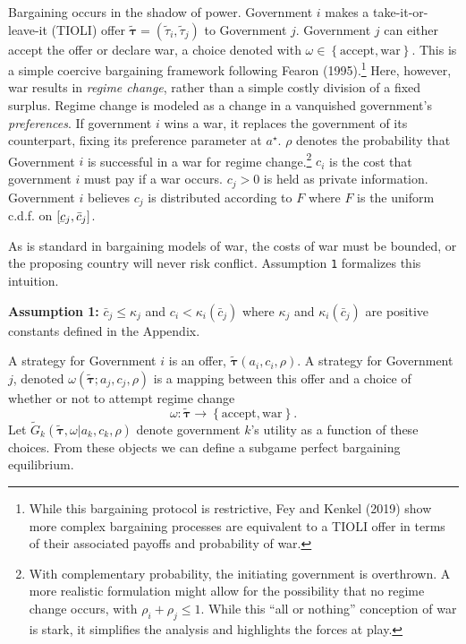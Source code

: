 \documentclass{puthesis}
\DeclareRobustCommand{\ubar}[1]{\underaccent{\bar}{#1}}
\begin{document}
Bargaining occurs in the shadow of power. Government \(i\) makes a
take-it-or-leave-it (TIOLI) offer
\(\tilde{\bm{\tau}} = \left( \tilde{\tau}_i, \tilde{\tau}_j \right)\) to
Government \(j\). Government \(j\) can either accept the offer or
declare war, a choice denoted with
\(\omega \in \left\{ \text{accept}, \text{war} \right\}\). This is a
simple coercive bargaining framework following Fearon (1995).\footnote{While
  this bargaining protocol is restrictive, Fey and Kenkel (2019) show
  more complex bargaining processes are equivalent to a TIOLI offer in
  terms of their associated payoffs and probability of war.} Here,
however, war results in \emph{regime change}, rather than a simple
costly division of a fixed surplus. Regime change is modeled as a change
in a vanquished government's \emph{preferences}. If government \(i\)
wins a war, it replaces the government of its counterpart, fixing its
preference parameter at \(a^\star\). \(\rho\) denotes the probability
that Government \(i\) is successful in a war for regime
change.\footnote{With complementary probability, the initiating
  government is overthrown. A more realistic formulation might allow for
  the possibility that no regime change occurs, with
  \(\rho_i + \rho_j \leq 1\). While this ``all or nothing'' conception
  of war is stark, it simplifies the analysis and highlights the forces
  at play.} \(c_i\) is the cost that government \(i\) must pay if a war
occurs. \(c_j > 0\) is held as private information. Government \(i\)
believes \(c_j\) is distributed according to \(F\) where \(F\) is the
uniform c.d.f. on \([\ubar{c}_j, \bar{c}_j]\).

As is standard in bargaining models of war, the costs of war must be
bounded, or the proposing country will never risk conflict. Assumption
\texttt{1} formalizes this intuition.

\textbf{Assumption 1:} \(\bar{c}_j \leq \kappa_j\) and
\(c_i < \kappa_i(\bar{c}_j)\) where \(\kappa_j\) and
\(\kappa_i(\bar{c}_j)\) are positive constants defined in the Appendix.

A strategy for Government \(i\) is an offer,
\(\tilde{\bm{\tau}}(a_i, c_i, \rho)\). A strategy for Government \(j\),
denoted \(\omega(\tilde{\bm{\tau}}; a_j, c_j, \rho)\) is a mapping
between this offer and a choice of whether or not to attempt regime
change \[
\omega : \tilde{\bm{\tau}} \rightarrow \left\{ \text{accept}, \text{war} \right\} .
\] Let \(\tilde{G}_k(\tilde{\bm{\tau}}, \omega | a_k, c_k, \rho)\)
denote government \(k\)'s utility as a function of these choices. From
these objects we can define a subgame perfect bargaining equilibrium.
\end{document}
